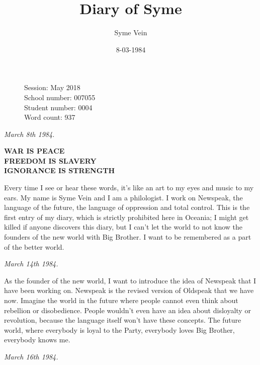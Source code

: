 \documentclass[12pt,a4paper]{article}
\title{Diary of Syme}
\author{Syme Vein}
\date{8-03-1984}
\begin{document}
\newpage
\maketitle
\begin{flushleft}
  \begin{figure}[b]
    Session: May 2018\\
    School number: 007055\\
    Student number: 0004\\
    Word count: 937
   \end{figure}
\end{flushleft}
\newpage
{}
\begin{flushleft}
  \textit{March 8th 1984.}
  \end{flushleft}

\begin{center}
  \textbf{WAR IS PEACE}\\
  \textbf{FREEDOM IS SLAVERY}\\
  \textbf{IGNORANCE IS STRENGTH}\\
\end{center}

Every time I see or hear these words, it’s like an art to my eyes and music to my ears. My name is Syme Vein and I am a philologist. I work on Newspeak, the language of the future, the language of oppression and total control. This is the first entry of my diary, which is strictly prohibited here in Oceania; I might get killed if anyone discovers this diary, but I can’t let the world to not know the founders of the new world with Big Brother. I want to be remembered as a part of the better world. \\


\begin{flushleft}
  \textit{March 14th 1984.}
  \end{flushleft}

As the founder of the new world, I want to introduce the idea of Newspeak that I have been working on. Newspeak is the revised version of Oldspeak that we have now. Imagine the world in the future where people cannot even think about rebellion or disobedience. People wouldn’t even have an idea about disloyalty or revolution, because the language itself won’t have these concepts. The future world, where everybody is loyal to the Party, everybody loves Big Brother, everybody knows me.

\newpage

\begin{flushleft}
  \textit{March 16th 1984.}
  \end{flushleft}
\end{document}
